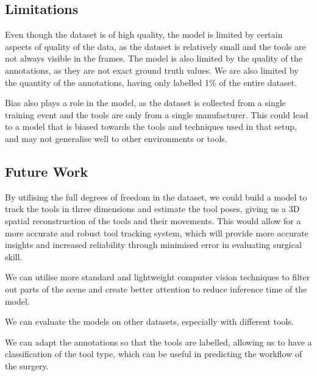 
\subsection{Limitations}

Even though the dataset is of high quality, the model is limited by certain aspects of quality of the data, as the dataset is relatively small and the tools are not always visible in the frames. The model is also limited by the quality of the annotations, as they are not exact ground truth values. We are also limited by the quantity of the annotations, having only labelled 1\% of the entire dataset.

Bias also plays a role in the model, as the dataset is collected from a single training event and the tools are only from a single manufacturer. This could lead to a model that is biased towards the tools and techniques used in that setup, and may not generalise well to other environments or tools.

\subsection{Future Work}

By utilising the full degrees of freedom in the dataset, we could build a model to track the tools in three dimensions and estimate the tool poses, giving us a 3D spatial reconstruction of the tools and their movements. This would allow for a more accurate and robust tool tracking system, which will provide more accurate insights and increased reliability through minimised error in evaluating surgical skill.

We can utilise more standard and lightweight computer vision techniques to filter out parts of the scene and create better attention to reduce inference time of the model.

We can evaluate the models on other datasets, especially with different tools.

We can adapt the annotations so that the tools are labelled, allowing us to have a classification of the tool type, which can be useful in predicting the workflow of the surgery.

